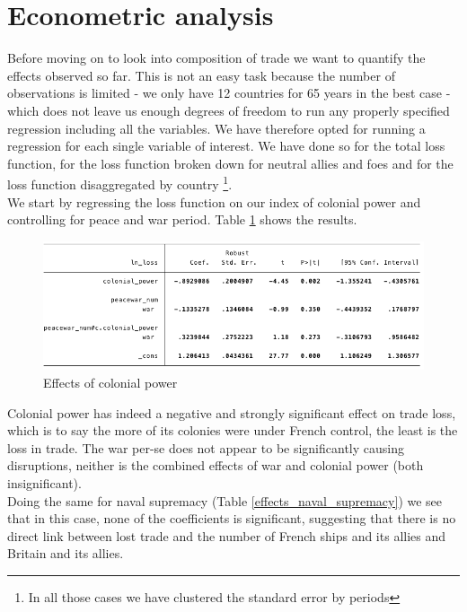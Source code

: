 \documentclass[12pt,a4paper,notitlepage,english]{article}
\begin{document}
\section{Econometric analysis}  \label{economtrics}


\begin{table}

\end{table}
\restoregeometry

Before moving on to look into composition of trade we want to quantify the effects observed so far. This is not an easy task because the number of observations is limited - we only have 12 countries for 65 years in the best case - which does not leave us enough degrees of freedom to run any properly specified regression including all the variables. We have therefore opted for running a regression for each single variable of interest. We have done so for the total loss function, for the loss function broken down for neutral allies and foes and for the loss function disaggregated by country \footnote{In all those cases we have clustered the standard error by periods}. \\
We start by regressing the loss function on our index of colonial power and controlling for peace and war period. Table \ref{effects_colonial_power} shows the results. 
\begin{figure}
\centering
\caption{Effects of colonial power}
\label{effects_colonial_power}
\includegraphics[scale=.65]{reg1}
\end{figure} 
Colonial power has indeed a negative and strongly significant effect on trade loss, which is to say the more of its colonies were under French control, the least is the loss in trade. The war per-se does not appear to be significantly causing disruptions, neither is the combined effects of war and colonial power (both insignificant). \\
Doing the same for naval supremacy (Table \ref{effects_naval_supremacy}) we see that in this case, none of the coefficients is significant, suggesting that there is no direct link between lost trade and the number of French ships and its allies and Britain and its allies. \\
\end{document}
